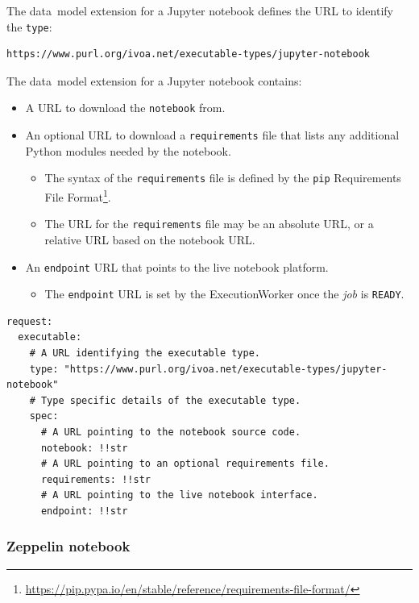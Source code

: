 \documentclass[11pt,a4paper]{ivoa}
\newcommand{\datamodel} {data~model}
\newcommand{\execworker} {ExecutionWorker}
\newcommand{\jupyternotebook} {Jupyter notebook}
\newcommand{\python} {Python}
\newcommand{\codeword}[1] {\texttt{#1}}
\newcommand{\footurl}[1] {\footnote{\url{#1}}}
\newcommand{\job} {\textit{job}}
\begin{document}
The \datamodel{} extension for a \jupyternotebook{} defines the URL
to identify the \codeword{type}:
\begin{lstlisting}[]
https://www.purl.org/ivoa.net/executable-types/jupyter-notebook
\end{lstlisting}
\hfill \break
The \datamodel{} extension for a \jupyternotebook{} contains:
\begin{itemize}
    \item A URL to download the \codeword{notebook} from.
    \item An optional URL to download a \codeword{requirements} file that lists any additional
    \python{} modules needed by the notebook.
    \begin{itemize}
        \item The syntax of the \codeword{requirements} file is defined by the \codeword{pip}
        Requirements File Format\footurl{https://pip.pypa.io/en/stable/reference/requirements-file-format/}.
        \item The URL for the \codeword{requirements} file may be an absolute URL, or a relative URL based on the notebook URL.
    \end{itemize}
    \item An \codeword{endpoint} URL that points to the live notebook platform.
    \begin{itemize}
        \item The \codeword{endpoint} URL is set by the \execworker{} once the \job{} is \codeword{READY}.
    \end{itemize}
\end{itemize}

\begin{lstlisting}[]
request:
  executable:
    # A URL identifying the executable type.
    type: "https://www.purl.org/ivoa.net/executable-types/jupyter-notebook"
    # Type specific details of the executable type.
    spec:
      # A URL pointing to the notebook source code.
      notebook: !!str
      # A URL pointing to an optional requirements file.
      requirements: !!str
      # A URL pointing to the live notebook interface.
      endpoint: !!str
\end{lstlisting}

\subsubsection{Zeppelin notebook}
\label{datamodel-zeppelin-notebook}
\end{document}

